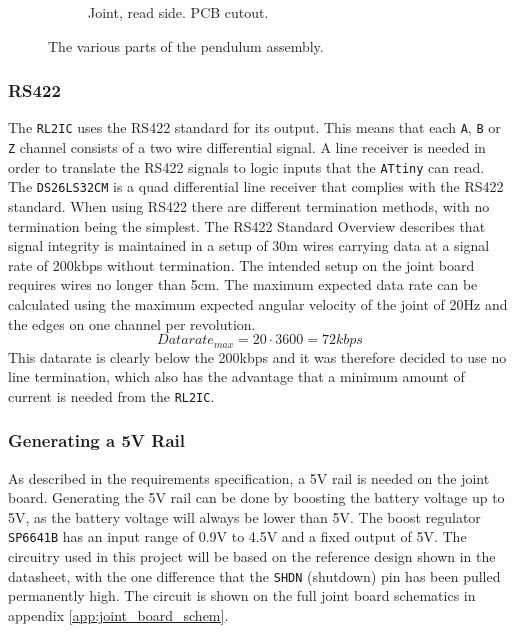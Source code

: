 \begin{figure}[H]
\begin{minipage}{.4\linewidth}
\begin{subfigure}[b]{\linewidth}
			\caption{Joint, read side. PCB cutout.}
			\label{sfig:readside_2}
		\end{subfigure}
	\end{minipage}
	\caption{The various parts of the pendulum assembly.}
	\label{fig:mechdesign}
\end{figure}

\subsubsection{RS422}
The \texttt{RL2IC} uses the RS422 standard for its output.
This means that each \texttt{A}, \texttt{B} or \texttt{Z} channel consists of a two wire differential signal.
A line receiver is needed in order to translate the RS422 signals to logic inputs that the \texttt{ATtiny} can read.
The \texttt{DS26LS32CM} is a quad differential line receiver that complies with the RS422 standard.  
When using RS422 there are different termination methods, with no termination being the simplest.
The RS422 Standard Overview \cite{rs422_texas} describes that signal integrity is maintained in a setup of \approx 30m wires carrying data at a signal rate of 200kbps without termination.
The intended setup on the joint board requires wires no longer than 5cm.
The maximum expected data rate can be calculated using the maximum expected angular velocity of the joint of 20Hz and the edges on one channel per revolution.
\begin{equation}
Datarate_{max}	= 20 \cdot 3600 = 72kbps
\end{equation}
This datarate is clearly below the 200kbps and it was therefore decided to use no line termination, which also has the advantage that a minimum amount of current is needed from the \texttt{RL2IC}.


\subsubsection{Generating a 5V Rail}
As described in the requirements specification, a 5V rail is needed on the joint board.
Generating the 5V rail can be done by boosting the battery voltage up to 5V, as the battery voltage will always be lower than 5V.
The boost regulator \texttt{SP6641B} \cite{sp6641b} has an input range of 0.9V to 4.5V and a fixed output of 5V.
The circuitry used in this project will be based on the reference design shown in the datasheet, with the one difference that the \texttt{SHDN} (shutdown) pin has been pulled permanently high.
The circuit is shown on the full joint board schematics in appendix \ref{app:joint_board_schem}.

